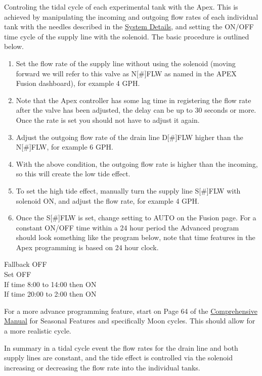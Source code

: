 \documentclass[]{book}
\providecommand{\tightlist}{%
  \setlength{\itemsep}{0pt}\setlength{\parskip}{0pt}}
\begin{document}
Controling the tidal cycle of each experimental tank with the Apex. This
is achieved by manipulating the incoming and outgoing flow rates of each
individual tank with the needles described in the
\protect\hyperlink{system-details}{System Details}, and setting the
ON/OFF time cycle of the supply line with the solenoid. The basic
procedure is outlined below.

\begin{enumerate}
\def\labelenumi{\arabic{enumi}.}
\tightlist
\item
  Set the flow rate of the supply line without using the solenoid
  (moving forward we will refer to this valve as N{[}\#{]}FLW as named
  in the APEX Fusion dashboard), for example 4 GPH.
\item
  Note that the Apex controller has some lag time in registering the
  flow rate after the valve has been adjusted, the delay can be up to 30
  seconds or more. Once the rate is set you should not have to adjust it
  again.
\item
  Adjust the outgoing flow rate of the drain line D{[}\#{]}FLW higher
  than the N{[}\#{]}FLW, for example 6 GPH.
\item
  With the above condition, the outgoing flow rate is higher than the
  incoming, so this will create the low tide effect.
\item
  To set the high tide effect, manually turn the supply line
  S{[}\#{]}FLW with solenoid ON, and adjust the flow rate, for example 4
  GPH.
\item
  Once the S{[}\#{]}FLW is set, change setting to AUTO on the Fusion
  page. For a constant ON/OFF time within a 24 hour period the Advanced
  program should look something like the program below, note that time
  features in the Apex programming is based on 24 hour clock.
\end{enumerate}

Fallback OFF\\
Set OFF\\
If time 8:00 to 14:00 then ON\\
If time 20:00 to 2:00 then ON

For a more advance programming feature, start on Page 64 of the
\href{/Manuals/Apex_Comprehensive_Reference_Manual.pdf}{Comprehensive
Manual} for Seasonal Features and specifically Moon cycles. This should
allow for a more realistic cycle.

In summary in a tidal cycle event the flow rates for the drain line and
both supply lines are constant, and the tide effect is controlled via
the solenoid increasing or decreasing the flow rate into the individual
tanks.
\end{document}
